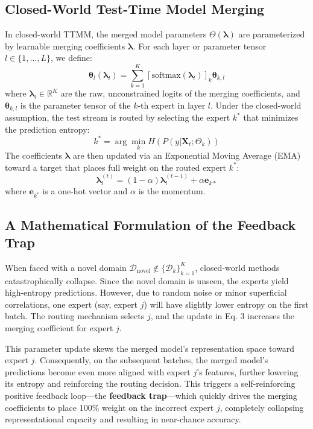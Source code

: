 \documentclass{article}
\theoremstyle{plain}
\theoremstyle{definition}
\theoremstyle{remark}
\begin{document}
\subsection{Closed-World Test-Time Model Merging}
In closed-world TTMM, the merged model parameters $\Theta(\boldsymbol{\lambda})$ are parameterized by learnable merging coefficients $\boldsymbol{\lambda}$. For each layer or parameter tensor $l \in \{1, \dots, L\}$, we define:
\begin{equation}
    \boldsymbol{\theta}_l(\boldsymbol{\lambda}_l) = \sum_{k=1}^K [\text{softmax}(\boldsymbol{\lambda}_l)]_k \boldsymbol{\theta}_{k,l}
\end{equation}
where $\boldsymbol{\lambda}_l \in \mathbb{R}^K$ are the raw, unconstrained logits of the merging coefficients, and $\boldsymbol{\theta}_{k,l}$ is the parameter tensor of the $k$-th expert in layer $l$. Under the closed-world assumption, the test stream is routed by selecting the expert $k^*$ that minimizes the prediction entropy:
\begin{equation}
    k^* = \arg\min_k H(P(y | \mathbf{X}_t; \Theta_k))
\end{equation}
The coefficients $\boldsymbol{\lambda}$ are then updated via an Exponential Moving Average (EMA) toward a target that places full weight on the routed expert $k^*$:
\begin{equation}
    \boldsymbol{\lambda}_l^{(t)} = (1 - \alpha) \boldsymbol{\lambda}_l^{(t-1)} + \alpha \mathbf{e}_{k*}
\end{equation}
where $\mathbf{e}_{k^*}$ is a one-hot vector and $\alpha$ is the momentum.

\subsection{A Mathematical Formulation of the Feedback Trap}
When faced with a novel domain $\mathcal{D}_{\text{novel}} \notin \{\mathcal{D}_k\}_{k=1}^K$, closed-world methods catastrophically collapse. Since the novel domain is unseen, the experts yield high-entropy predictions. However, due to random noise or minor superficial correlations, one expert (say, expert $j$) will have slightly lower entropy on the first batch. The routing mechanism selects $j$, and the update in Eq. 3 increases the merging coefficient for expert $j$. 

This parameter update skews the merged model's representation space toward expert $j$. Consequently, on the subsequent batches, the merged model's predictions become even more aligned with expert $j$'s features, further lowering its entropy and reinforcing the routing decision. This triggers a self-reinforcing positive feedback loop—the \textbf{feedback trap}—which quickly drives the merging coefficients to place 100\% weight on the incorrect expert $j$, completely collapsing representational capacity and resulting in near-chance accuracy.
\end{document}
